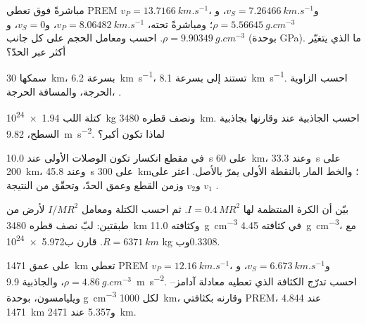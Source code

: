 \begin{exercise}[$\star$]\label{exo:b1:layered-earth:2}
مباشرةً فوق  تعطي PREM $v_P = \qty{13.7166}{km.s^{-1}}$، و$v_S = \qty{7.26466}{km.s^{-1}}$، و$\rho = \qty{5.56645}{g.cm^{-3}}$؛ ومباشرةً تحته، $v_P = \qty{8.06482}{km.s^{-1}}$، و$v_S = 0$، و$\rho = \qty{9.90349}{g.cm^{-3}}$. احسب  ومعامل الحجم على كل جانب (بوحدة \unit{GPa}). ما الذي يتغيّر أكثر عبر الحدّ؟
\end{exercise}

\begin{exercise}[$\star$]\label{exo:b1:layered-earth:3}
 سمكها \qty{30}{km}، بسرعة \qty{6.2}{km.s^{-1}}، تستند إلى  بسرعة \qty{8.1}{km.s^{-1}}. احسب الزاوية الحرجة، والمسافة الحرجة، .
\end{exercise}

\begin{exercise}[$\star$]\label{exo:b1:layered-earth:4}
كتلة اللب \qty{1.94e24}{kg} ونصف قطره \qty{3480}{km}. احسب الجاذبية عند  وقارنها بجاذبية السطح، \qty{9.82}{m.s^{-2}}. لماذا تكون أكبر؟
\end{exercise}

\begin{exercise}[$\star\star$]\label{exo:b1:layered-earth:5}
في مقطع انكسار تكون الوصلات الأولى عند \qty{10.0}{s} على \qty{60}{km}، وعند \qty{33.3}{s} على \qty{200}{km}، وعند \qty{45.8}{s} على \qty{300}{km}؛ والخط المار بالنقطة الأولى يمرّ بالأصل. اعثر على $v_1$ و$v_2$ وزمن القطع وعمق الحدّ، وتحقّق من النتيجة .
\end{exercise}

\begin{exercise}[$\star\star$]\label{exo:b1:layered-earth:6}
بيّن أن الكرة المنتظمة لها $I = 0.4\,MR^2$. ثم احسب الكتلة ومعامل $I/MR^2$ لأرض من طبقتين: لبّ نصف قطره \qty{3480}{km} وكثافته \qty{11.0}{g.cm^{-3}} في  كثافته \qty{4.45}{g.cm^{-3}}، مع $R = \qty{6371}{km}$. قارن ب\num{5.972e24} kg وب$0.3308$.
\end{exercise}

\begin{exercise}[$\star\star$]\label{exo:b1:layered-earth:7}
على عمق \qty{1471}{km} تعطي PREM $v_P = \qty{12.16}{km.s^{-1}}$، و$v_S = \qty{6.673}{km.s^{-1}}$، و$\rho = \qty{4.86}{g.cm^{-3}}$، والجاذبية \qty{9.9}{m.s^{-2}}. احسب تدرّج الكثافة الذي تعطيه معادلة آدامز–ويليامسون، بوحدة \unit{g.cm^{-3}} لكل \qty{1000}{km}، وقارنه بكثافتي PREM، \num{4.844} عند \qty{1471}{km} و\num{5.357} عند \qty{2471}{km}.
\end{exercise}

